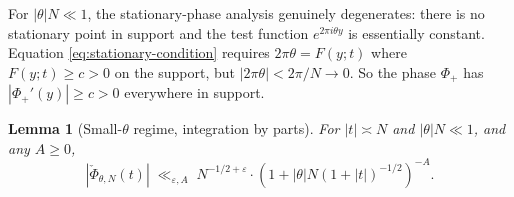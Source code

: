 \documentclass[11pt]{article}
\newtheorem{lemma}[theorem]{Lemma}
\theoremstyle{definition}
\begin{document}
For $|\theta|N \ll 1$, the stationary-phase analysis genuinely degenerates: there is no stationary point in support and the test function $e^{2\pi i\theta y}$ is essentially constant. Equation \eqref{eq:stationary-condition} requires $2\pi\theta = F(y;t)$ where $F(y;t) \ge c > 0$ on the support, but $|2\pi\theta| < 2\pi/N \to 0$. So the phase $\Phi_+$ has $|\Phi_+'(y)| \ge c > 0$ everywhere in support.

\begin{lemma}[Small-$\theta$ regime, integration by parts]\label{lem:small-theta-IBP}
For $|t| \asymp N$ and $|\theta|N \ll 1$, and any $A \ge 0$,
\begin{equation}\label{eq:small-theta-bound}
    |\check\Phi_{\theta,N}(t)| \;\ll_{\varepsilon,A}\; N^{-1/2+\varepsilon}\cdot(1+|\theta|N(1+|t|)^{-1/2})^{-A}.
\end{equation}
\end{lemma}
\end{document}
